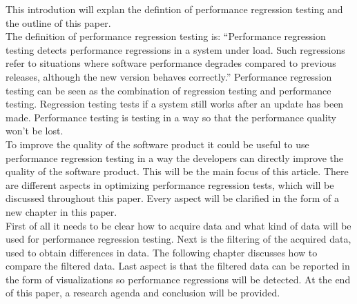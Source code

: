 This introdution will explan the defintion of performance regression testing and the outline of this paper. \\


The definition of performance regression testing is: ``Performance regression testing detects performance
regressions in a system under load. Such regressions refer to
situations where software performance degrades compared to
previous releases, although the new version behaves correctly.''\cite{foo2010mining}
Performance regression testing can be seen as the combination of regression testing and performance testing. Regression testing tests if a system still works after an update has been made. Performance testing is testing in a way so that the performance quality won't be lost. \\
To improve the quality of the software product it could be useful to use performance regression testing in a way the developers can
directly improve the quality of the software product. This will be the main focus of this article. There are different aspects in optimizing performance regression tests, which will be discussed throughout this paper. Every aspect will be clarified in the form of a new chapter in this paper. \\ First of all it needs to be clear how to acquire data and what kind of data will be used for performance regression testing. Next is the filtering of the acquired data, used to obtain differences in data. The following chapter discusses how to compare the filtered data. Last aspect is that the filtered data can be reported in the form of visualizations so performance regressions will be detected. At the end of this paper, a research agenda and conclusion will be provided.

